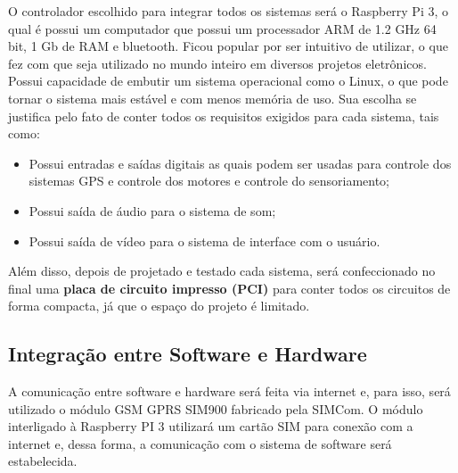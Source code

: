 O controlador escolhido para integrar todos os sistemas será o Raspberry Pi 3, o qual é possui um computador que possui um processador ARM de 1.2 GHz 64 bit, 1 Gb de RAM e bluetooth. Ficou popular por ser intuitivo de utilizar, o que fez com que seja utilizado no mundo inteiro em diversos projetos eletrônicos. Possui capacidade de embutir um sistema operacional como o Linux, o que pode tornar o sistema mais estável e com menos memória de uso. Sua escolha se justifica pelo fato de conter todos os requisitos exigidos para cada sistema, tais como:

\begin{itemize}
  \item Possui entradas e saídas digitais as quais podem ser usadas para controle dos sistemas GPS e controle dos motores e controle do sensoriamento;
  \item Possui saída de áudio para o sistema de som;
  \item Possui saída de vídeo para o sistema de interface com o usuário.
\end{itemize}

Além disso, depois de projetado e testado cada sistema, será confeccionado no final uma \textbf{placa de circuito impresso (PCI)} para conter todos os circuitos de forma compacta, já que o espaço do projeto é limitado.

\subsection{Integração entre Software e Hardware}
A comunicação entre software e hardware será feita via internet e, para isso, será utilizado o módulo GSM GPRS SIM900 fabricado pela SIMCom. O módulo interligado à Raspberry PI 3 utilizará um cartão SIM para conexão com a internet e, dessa forma, a comunicação com o sistema de software será estabelecida.

